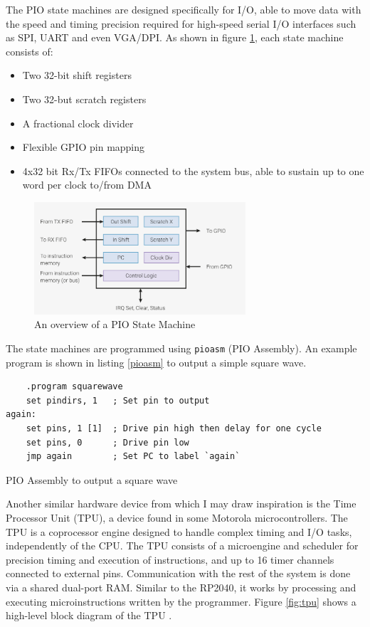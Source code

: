 \documentclass[a4paper,fleqn,12pt]{article}
\begin{document}
The PIO state machines are designed specifically for I/O, able to move data with the speed and timing precision required for high-speed serial I/O interfaces such as SPI, UART and even VGA/DPI. As shown in figure \ref{fig:pio-sm}, each state machine consists of:

\begin{itemize}
    \item Two 32-bit shift registers
    \item Two 32-but scratch registers
    \item A fractional clock divider
    \item Flexible GPIO pin mapping
    \item 4x32 bit Rx/Tx FIFOs connected to the system bus, able to sustain up to one word per clock to/from DMA
\end{itemize}

\begin{figure}[H]
    \centering
    \includegraphics[width=0.7\textwidth]{../img/rp2040-state-machine.png}
    \caption{An overview of a PIO State Machine \cite{rp2040}}
    \label{fig:pio-sm}
\end{figure}

The state machines are programmed using \texttt{pioasm} (PIO Assembly). An example program is shown in listing \ref{pioasm} to output a simple square wave.

\begin{listing}[b]
    \vspace{0.5cm}
    \begin{verbatim}
    .program squarewave
    set pindirs, 1   ; Set pin to output
again:
    set pins, 1 [1]  ; Drive pin high then delay for one cycle
    set pins, 0      ; Drive pin low
    jmp again        ; Set PC to label `again`
    \end{verbatim}
    \caption{PIO Assembly to output a square wave \cite{rp2040}}
    \label{pioasm}
\end{listing}

Another similar hardware device from which I may draw inspiration is the Time Processor Unit (TPU), a device found in some Motorola microcontrollers. The TPU is a coprocessor engine designed to handle complex timing and I/O tasks, independently of the CPU. The TPU consists of a microengine and scheduler for precision timing and execution of instructions, and up to 16 timer channels connected to external pins. Communication with the rest of the system is done via a shared dual-port RAM. Similar to the RP2040, it works by processing and executing microinstructions written by the programmer. Figure \ref{fig:tpu} shows a high-level block diagram of the TPU \cite{tpu}.
\end{document}
